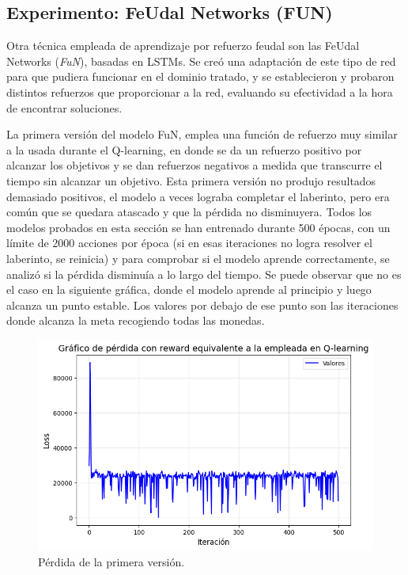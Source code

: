 \documentclass[letterpaper]{article} %
\begin{document}
\subsection{Experimento: FeUdal Networks (FUN)}

Otra técnica empleada de aprendizaje por refuerzo feudal son las FeUdal Networks (\textit{FuN}), basadas en LSTMs. Se creó una adaptación de este tipo de red para que pudiera funcionar en el dominio tratado, y se establecieron y probaron distintos refuerzos que proporcionar a la red, evaluando su efectividad a la hora de encontrar soluciones.

La primera versión del modelo FuN, emplea una función de refuerzo muy similar a la usada durante el Q-learning, en donde se da un refuerzo positivo por alcanzar los objetivos y se dan refuerzos negativos a medida que transcurre el tiempo sin alcanzar un objetivo. 
Esta primera versión no produjo resultados demasiado positivos, el modelo a veces lograba completar el laberinto, pero era común que se quedara atascado y que la pérdida no disminuyera. 
Todos los modelos probados en esta sección se han entrenado durante 500 épocas, con un límite de 2000 acciones por época (si en esas iteraciones no logra resolver el laberinto, 
se reinicia) y para comprobar si el modelo aprende correctamente, se analizó si la pérdida disminuía a lo largo del tiempo. Se puede observar que no es el caso en la siguiente gráfica, donde el modelo aprende al principio y luego alcanza un punto estable. Los valores por debajo de ese punto son las iteraciones donde alcanza la meta recogiendo todas las monedas.

\begin{figure}[H]
    \centering
    \includegraphics[width=0.9\columnwidth]{FuN_1.png}
    \caption{Pérdida de la primera versión.\label{fig:FuN6}}
\end{figure}
\end{document}
